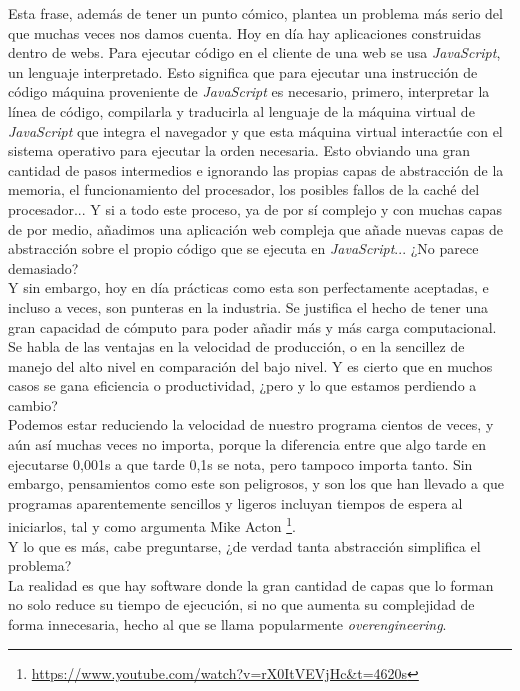 Esta frase, además de tener un punto cómico, plantea un problema más serio del que muchas veces nos damos cuenta. Hoy en día hay aplicaciones construidas dentro de webs. Para ejecutar código en el cliente de una web se usa \emph{JavaScript}, un lenguaje interpretado. Esto significa que para ejecutar una instrucción de código máquina proveniente de \emph{JavaScript} es necesario, primero, interpretar la línea de código, compilarla y traducirla al lenguaje de la máquina virtual de \emph{JavaScript} que integra el navegador y que esta máquina virtual interactúe con el sistema operativo para ejecutar la orden necesaria. Esto obviando una gran cantidad de pasos intermedios e ignorando las propias capas de abstracción de la memoria, el funcionamiento del procesador, los posibles fallos de la caché del procesador... Y si a todo este proceso, ya de por sí complejo y con muchas capas de por medio, añadimos una aplicación web compleja que añade nuevas capas de abstracción sobre el propio código que se ejecuta en \emph{JavaScript}... ¿No parece demasiado?\\

Y sin embargo, hoy en día prácticas como esta son perfectamente aceptadas, e incluso a veces, son punteras en la industria. Se justifica el hecho de tener una gran capacidad de cómputo para poder añadir más y más carga computacional. Se habla de las ventajas en la velocidad de producción, o en la sencillez de manejo del alto nivel en comparación del bajo nivel. Y es cierto que en muchos casos se gana eficiencia o productividad, ¿pero y lo que estamos perdiendo a cambio?\\

Podemos estar reduciendo la velocidad de nuestro programa cientos de veces, y aún así muchas veces no importa, porque la diferencia entre que algo tarde en ejecutarse 0,001s a que tarde 0,1s se nota, pero tampoco importa tanto. Sin embargo, pensamientos como este son peligrosos, y son los que han llevado a que programas aparentemente sencillos y ligeros incluyan tiempos de espera al iniciarlos, tal y como argumenta Mike Acton                           \footnote{\url{https://www.youtube.com/watch?v=rX0ItVEVjHc&t=4620s}}.\\

Y lo que es más, cabe preguntarse, ¿de verdad tanta abstracción simplifica el problema?\\

La realidad es que hay software donde la gran cantidad de capas que lo forman no solo reduce su tiempo de ejecución, si no que aumenta su complejidad de forma innecesaria, hecho al que se llama popularmente \emph{overengineering}.\\

